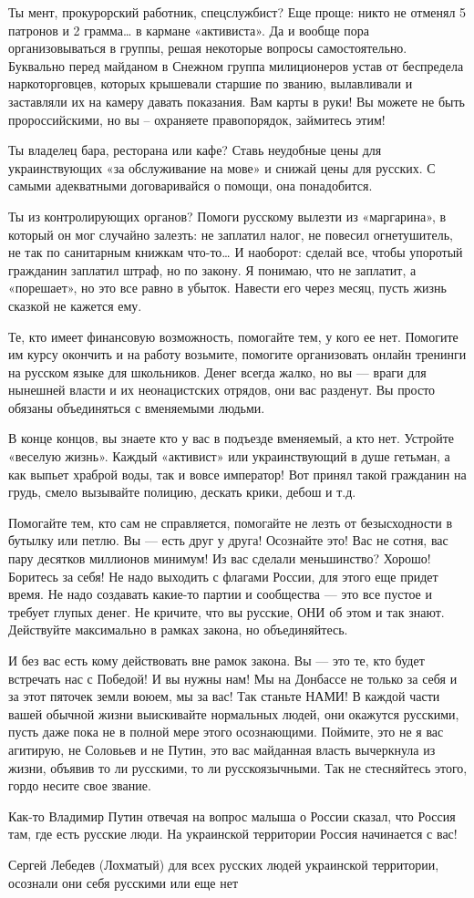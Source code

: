 Ты мент, прокурорский работник, спецслужбист? Еще проще: никто не отменял 5
патронов и 2 грамма… в кармане «активиста». Да и вообще пора организовываться в
группы, решая некоторые вопросы самостоятельно. Буквально перед майданом в
Снежном группа милиционеров устав от беспредела наркоторговцев, которых
крышевали старшие по званию, вылавливали и заставляли их на камеру давать
показания. Вам карты в руки! Вы можете не быть пророссийскими, но вы –
охраняете правопорядок, займитесь этим!

Ты владелец бара, ресторана или кафе? Ставь неудобные цены для украинствующих
«за обслуживание на мове» и снижай цены для русских. С самыми адекватными
договаривайся о помощи, она понадобится.

Ты из контролирующих органов? Помоги русскому вылезти из «маргарина», в который
он мог случайно залезть: не заплатил налог, не повесил огнетушитель, не так по
санитарным книжкам что-то… И наоборот: сделай все, чтобы упоротый гражданин
заплатил штраф, но по закону. Я понимаю, что не заплатит, а «порешает», но это
все равно в убыток. Навести его через месяц, пусть жизнь сказкой не кажется
ему.

Те, кто имеет финансовую возможность, помогайте тем, у кого ее нет. Помогите им
курсу окончить и на работу возьмите, помогите организовать онлайн тренинги на
русском языке для школьников. Денег всегда жалко, но вы --- враги для нынешней
власти и их неонацистских отрядов, они вас разденут. Вы просто обязаны
объединяться с вменяемыми людьми.

В конце концов, вы знаете кто у вас в подъезде вменяемый, а кто нет. Устройте
«веселую жизнь». Каждый «активист» или украинствующий в душе гетьман, а как
выпьет храброй воды, так и вовсе император! Вот принял такой гражданин на
грудь, смело вызывайте полицию, дескать крики, дебош и т.д.

Помогайте тем, кто сам не справляется, помогайте не лезть от безысходности в
бутылку или петлю. Вы --- есть друг у друга! Осознайте это! Вас не сотня, вас
пару десятков миллионов минимум! Из вас сделали меньшинство? Хорошо! Боритесь
за себя! Не надо выходить с флагами России, для этого еще придет время. Не надо
создавать какие-то партии и сообщества --- это все пустое и требует глупых денег.
Не кричите, что вы русские, ОНИ об этом и так знают. Действуйте максимально в
рамках закона, но объединяйтесь.

И без вас есть кому действовать вне рамок закона. Вы --- это те, кто будет
встречать нас с Победой! И вы нужны нам! Мы на Донбассе не только за себя и за
этот пяточек земли воюем, мы за вас! Так станьте НАМИ! В каждой части вашей
обычной жизни выискивайте нормальных людей, они окажутся русскими, пусть даже
пока не в полной мере этого осознающими. Поймите, это не я вас агитирую, не
Соловьев и не Путин, это вас майданная власть вычеркнула из жизни, объявив то
ли русскими, то ли русскоязычными. Так не стесняйтесь этого, гордо несите свое
звание.

Как-то Владимир Путин отвечая на вопрос малыша о России сказал, что Россия там,
где есть русские люди. На украинской территории Россия начинается с вас!

Сергей Лебедев (Лохматый) для всех русских людей украинской территории,
осознали они себя русскими или еще нет
  
